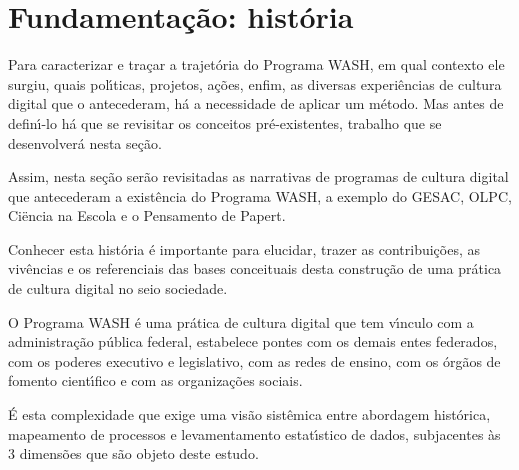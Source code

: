 \documentclass[
12pt,		%
openright,	%
twoside,  %
a4paper,			%
chapter=TITLE,		%
english,			%
french,				%
spanish,			%
brazil				%
]{USPSC-classe/USPSC_RedarTex}
\begin{document}
\section[Fundamenta\c{c}\~ao: hist\'oria]{Fundamenta\c{c}\~ao: hist\'oria}\label{Fundamenta\c{c}\~ao: hist\'oria}
Para caracterizar e tra\c{c}ar a trajet\'oria do Programa WASH, em qual contexto ele surgiu, quais pol\'{\i}ticas, projetos, a\c{c}\~oes, enfim, as diversas experi\^encias de cultura digital que o antecederam, h\'a a necessidade de aplicar um m\'etodo. Mas antes de defin\'{\i}-lo h\'a que se revisitar os conceitos pr\'e-existentes, trabalho que se desenvolver\'a nesta se\c{c}\~ao.










Assim, nesta se\c{c}\~ao ser\~ao revisitadas as narrativas de programas de cultura digital que antecederam a exist\^encia do Programa WASH, a exemplo do GESAC, OLPC, Ciëncia na Escola e o Pensamento de Papert.










Conhecer esta hist\'oria \'e importante para elucidar, trazer as contribui\c{c}\~oes, as viv\^encias e os referenciais das bases conceituais desta constru\c{c}\~ao de uma pr\'atica de cultura digital no seio sociedade.










O Programa WASH \'e uma pr\'atica de cultura digital que tem v\'{\i}nculo com a administra\c{c}\~ao p\'ublica federal, estabelece pontes com os demais entes federados, com os poderes executivo e legislativo, com as redes de ensino, com os \'org\~aos de fomento cient\'{\i}fico e com as organiza\c{c}\~oes sociais.










\'E esta complexidade que exige uma vis\~ao sist\^emica entre abordagem hist\'orica, mapeamento de processos e levamentamento estat\'{\i}stico de dados, subjacentes \`as 3 dimens\~oes que s\~ao objeto deste estudo.
\end{document}
